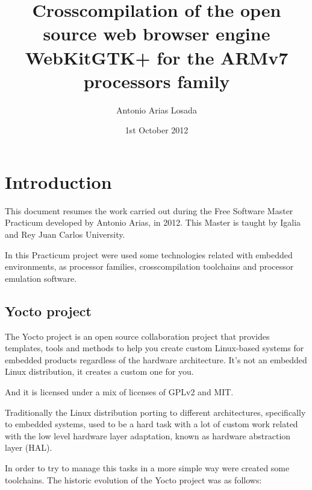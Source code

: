 \documentclass[a4paper,11pt,openany]{report}
\title{Crosscompilation of the open source web browser engine WebKitGTK+ for the ARMv7 processors family}
\author{Antonio Arias Losada}
\date{1st October 2012}
\begin{document}
\maketitle
\tableofcontents
\listoffigures


\chapter{Introduction}
This document resumes the work carried out during the Free Software Master\cite{master} Practicum developed by Antonio Arias, in 2012. This Master is taught by Igalia and Rey Juan Carlos University.

In this Practicum project were used some technologies related with embedded environments, as processor families, crosscompilation toolchains and processor emulation software.

\section{Yocto project}
The Yocto\cite{yocto} project is an open source collaboration project that provides templates, tools and methods to help you create custom Linux-based systems for embedded products regardless of the hardware architecture. It's not an embedded Linux distribution, it creates a custom one for you.

And it is licensed under a mix of licenses of GPLv2 and MIT.

Traditionally the Linux distribution porting to different architectures, specifically to embedded systems, used to be a hard task with a lot of custom work related with the low level hardware layer adaptation, known as hardware abstraction layer (HAL).

In order to try to manage this tasks in a more simple way were created some toolchains. The historic evolution of the Yocto project was as follows:
\end{document}
